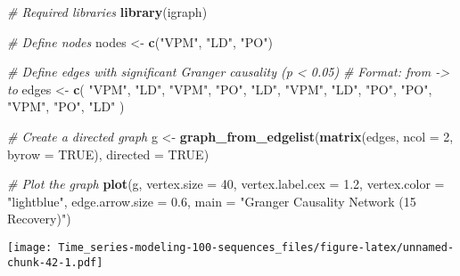 \documentclass[
]{article}
\newenvironment{Shaded}{\begin{snugshade}}{\end{snugshade}}
\newcommand{\AttributeTok}[1]{\textcolor[rgb]{0.13,0.29,0.53}{#1}}
\newcommand{\CommentTok}[1]{\textcolor[rgb]{0.56,0.35,0.01}{\textit{#1}}}
\newcommand{\ConstantTok}[1]{\textcolor[rgb]{0.56,0.35,0.01}{#1}}
\newcommand{\DecValTok}[1]{\textcolor[rgb]{0.00,0.00,0.81}{#1}}
\newcommand{\FloatTok}[1]{\textcolor[rgb]{0.00,0.00,0.81}{#1}}
\newcommand{\FunctionTok}[1]{\textcolor[rgb]{0.13,0.29,0.53}{\textbf{#1}}}
\newcommand{\NormalTok}[1]{#1}
\newcommand{\OtherTok}[1]{\textcolor[rgb]{0.56,0.35,0.01}{#1}}
\newcommand{\StringTok}[1]{\textcolor[rgb]{0.31,0.60,0.02}{#1}}
\begin{document}
\begin{Shaded}
\begin{Highlighting}[]
\CommentTok{\# Required libraries}
\FunctionTok{library}\NormalTok{(igraph)}

\CommentTok{\# Define nodes}
\NormalTok{nodes }\OtherTok{\textless{}{-}} \FunctionTok{c}\NormalTok{(}\StringTok{"VPM"}\NormalTok{, }\StringTok{"LD"}\NormalTok{, }\StringTok{"PO"}\NormalTok{)}

\CommentTok{\# Define edges with significant Granger causality (p \textless{} 0.05)}
\CommentTok{\# Format: from {-}\textgreater{} to}
\NormalTok{edges }\OtherTok{\textless{}{-}} \FunctionTok{c}\NormalTok{(}
  \StringTok{"VPM"}\NormalTok{, }\StringTok{"LD"}\NormalTok{,}
  \StringTok{"VPM"}\NormalTok{, }\StringTok{"PO"}\NormalTok{,}
  \StringTok{"LD"}\NormalTok{, }\StringTok{"VPM"}\NormalTok{,}
  \StringTok{"LD"}\NormalTok{, }\StringTok{"PO"}\NormalTok{,}
  \StringTok{"PO"}\NormalTok{, }\StringTok{"VPM"}\NormalTok{,}
  \StringTok{"PO"}\NormalTok{, }\StringTok{"LD"}
\NormalTok{)}

\CommentTok{\# Create a directed graph}
\NormalTok{g }\OtherTok{\textless{}{-}} \FunctionTok{graph\_from\_edgelist}\NormalTok{(}\FunctionTok{matrix}\NormalTok{(edges, }\AttributeTok{ncol =} \DecValTok{2}\NormalTok{, }\AttributeTok{byrow =} \ConstantTok{TRUE}\NormalTok{), }\AttributeTok{directed =} \ConstantTok{TRUE}\NormalTok{)}

\CommentTok{\# Plot the graph}
\FunctionTok{plot}\NormalTok{(g,}
     \AttributeTok{vertex.size =} \DecValTok{40}\NormalTok{,}
     \AttributeTok{vertex.label.cex =} \FloatTok{1.2}\NormalTok{,}
     \AttributeTok{vertex.color =} \StringTok{"lightblue"}\NormalTok{,}
     \AttributeTok{edge.arrow.size =} \FloatTok{0.6}\NormalTok{,}
     \AttributeTok{main =} \StringTok{"Granger Causality Network (15 Recovery)"}\NormalTok{)}
\end{Highlighting}
\end{Shaded}

\texttt{[image: Time\_series-modeling-100-sequences\_files/figure-latex/unnamed-chunk-42-1.pdf]}
\end{document}
